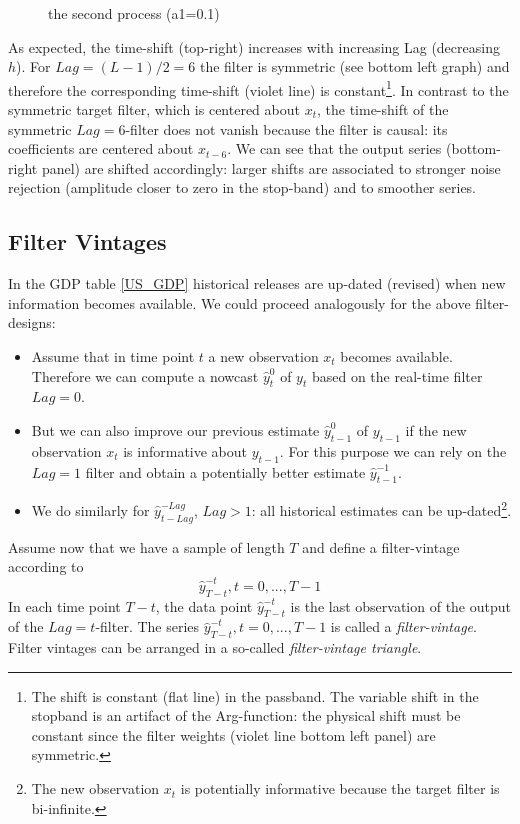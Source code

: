 \documentclass[a4paper]{book}
\begin{document}
\begin{enumerate}
\begin{figure}[H]
\begin{center}
{  the second process (a1=0.1)\label{z_dfa_ar1_amp_shift_Lag_0}}\end{center}\end{figure}As expected, the time-shift (top-right) increases with increasing Lag (decreasing $h$).
For $Lag=(L-1)/2=6$ the filter is symmetric (see bottom left graph) and therefore
the corresponding time-shift (violet line) is constant\footnote{The shift is constant (flat line) in the passband. The variable shift
in the stopband is an artifact of the Arg-function: the physical shift must be constant
since the filter weights (violet line bottom left
panel) are symmetric.}. In contrast to the symmetric target filter, which is centered about $x_t$, the time-shift of the symmetric $Lag=6$-filter does not vanish because the filter is causal: its coefficients are centered about $x_{t-6}$. We can see that the output series
(bottom-right panel) are shifted accordingly: larger shifts are associated to stronger noise rejection (amplitude closer to zero in the stop-band) and to smoother series. 
\end{enumerate}





\subsection{Filter Vintages}\label{back_uni_rev}


In the GDP table \ref{US_GDP} historical releases are up-dated (revised) when new information becomes available. We could proceed analogously for the above filter-designs: 
\begin{itemize}
\item Assume that in time point $t$ a new observation $x_t$ becomes available. Therefore we can compute a nowcast $\hat{y}_t^0$ of $y_t$ based on the real-time filter $Lag=0$.
\item But we can also improve our previous estimate $\hat{y}_{t-1}^{0}$ of $y_{t-1}$ if the new observation $x_t$ is informative about $y_{t-1}$. For this purpose we can rely on the $Lag=1$ filter and obtain a potentially better estimate $\hat{y}_{t-1}^{-1}$.
\item We do similarly for $\hat{y}_{t-Lag}^{-Lag}$, $Lag>1$: all historical estimates can be up-dated\footnote{The new observation $x_t$ is potentially informative because the target filter is bi-infinite.}.
\end{itemize}
Assume now that we have a sample of length $T$ and define a filter-vintage according to 
\[\hat{y}_{T-t}^{-t}, t=0,...,T-1\]
In each time point $T-t$, the data point $\hat{y}_{T-t}^{-t}$ is the last observation of the output of the $Lag=t$-filter. The series $\hat{y}_{T-t}^{-t}, t=0,...,T-1$ is called a \emph{filter-vintage}. Filter vintages can be arranged in a so-called \emph{filter-vintage triangle}.
\end{document}
